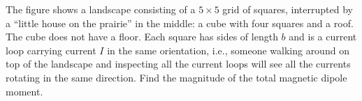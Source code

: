 The figure shows a landscape consisting of a $5\times5$ grid of squares,
interrupted by a ``little house on the prairie'' in the middle: a cube
with four squares and a roof. The cube does not have a floor. Each square
has sides of length $b$ and is a current loop carrying current $I$ in the
same orientation, i.e., someone walking around on top of the landscape
and inspecting all the current loops will see all the currents rotating
in the same direction. Find the magnitude of the total magnetic dipole moment.\answercheck
{}
